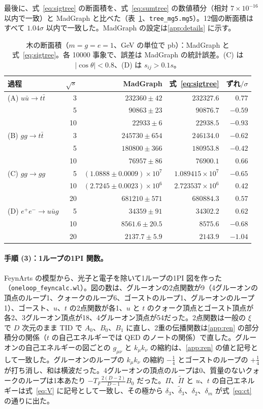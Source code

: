 \documentclass[a4paper,10pt]{ltjsarticle}
\begin{document}
最後に、式~\eqref{eq:sigtree} の断面積を、式~\eqref{eq:sumtree} の数値積分（相対 $7\times10^{-16}$ 以内で一致）と MadGraph と比べた（表~\ref{tab:tree}、\texttt{tree\_mg5.mg5}）。12個の断面積はすべて $1.04\sigma$ 以内で一致した。MadGraph の設定は\ref{app:details} に示す。

\begin{table}[tbp]
\centering\small
\caption{木の断面積（$m=g=e=1$、GeV の単位で pb）：MadGraph と式~\eqref{eq:sigtree}。各 10000 事象で、誤差は MadGraph の統計誤差。(C) は $|\cos\theta|<0.8$、(D) は $s_{ij}>0.1s$。}
\label{tab:tree}
\begin{tabular}{lrrrr}
\toprule
過程 & $\sqrt s$ & MadGraph & 式~\eqref{eq:sigtree} & ずれ$/\sigma$ \\
\midrule
(A) $u\bar u\to t\bar t$ & 3 & $232360\pm42$ & $232327.6$ & $0.77$ \\
 & 5 & $90863\pm23$ & $90876.7$ & $-0.59$ \\
 & 10 & $22933\pm6$ & $22938.5$ & $-0.93$ \\
(B) $gg\to t\bar t$ & 3 & $245730\pm654$ & $246134.0$ & $-0.62$ \\
 & 5 & $180800\pm366$ & $180953.8$ & $-0.42$ \\
 & 10 & $76957\pm86$ & $76900.1$ & $0.66$ \\
(C) $gg\to gg$ & 5 & $(1.0888\pm0.0009)\times10^7$ & $1.089415\times10^7$ & $-0.65$ \\
 & 10 & $(2.7245\pm0.0023)\times10^6$ & $2.723537\times10^6$ & $0.42$ \\
 & 20 & $681210\pm571$ & $680884.3$ & $0.57$ \\
(D) $e^+e^-\to u\bar ug$ & 5 & $34359\pm91$ & $34302.2$ & $0.62$ \\
 & 10 & $8561.6\pm20.5$ & $8575.6$ & $-0.68$ \\
 & 20 & $2137.7\pm5.9$ & $2143.9$ & $-1.04$ \\
\bottomrule
\end{tabular}
\end{table}

\paragraph{手順 (3)：1ループの1PI 関数。}FeynArts の模型から、光子と電子を除いて1ループの1PI 図を作った（\texttt{oneloop\_feyncalc.wl}）。図の数は、グルーオンの2点関数が9（4グルーオンの頂点のループ1、クォークのループ6、ゴーストのループ1、グルーオンのループ1）、ゴースト、$u$、$t$ の2点関数が各1、$u$ と $t$ のクォーク頂点とゴースト頂点が各2、3グルーオン頂点が18、4グルーオン頂点が54だった。2点関数は一般の $\xi$ で $D$ 次元のまま TID で $A_0$、$B_0$、$B_1$ に直し、2重の伝播関数は\ref{app:ren} の部分積分の関係（$t$ の自己エネルギーでは QED のノートの関係）で直した。グルーオンの自己エネルギーの図ごとの $g_{\mu\nu}$ と $k_\mu k_\nu$ の縮約は、\ref{app:ren} の値と記号として一致した。グルーオンのループの $k_\mu k_\nu$ の縮約 $-\frac14$ とゴーストのループの $+\frac14$ が打ち消し、和は横波だった。4グルーオンの頂点のループは0、質量のないクォークのループは1本あたり $-T_F\frac{2(D-2)}{D-1}B_0$ だった。$\Pi$、$\tilde\Pi$ と $u$、$t$ の自己エネルギーは式~\eqref{eq:V} に記号として一致し、その極から $\delta_3$、$\tilde\delta_3$、$\delta_2$、$\delta_m$ が式~\eqref{eq:ct} の通りに出た。
\end{document}
